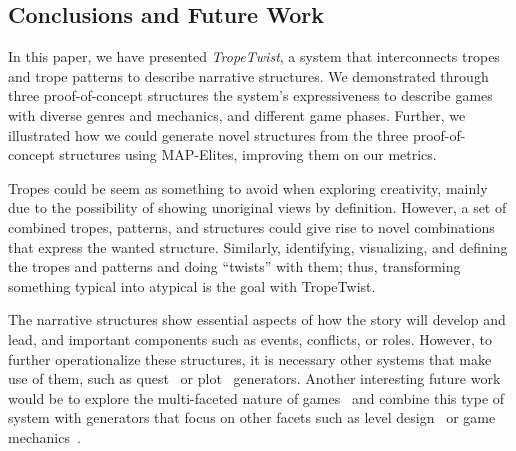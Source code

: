 \subsection{Conclusions and Future Work}


In this paper, we have presented \emph{TropeTwist}, a system that interconnects tropes and trope patterns to describe narrative structures. We demonstrated through three proof-of-concept structures the system's expressiveness to describe games with diverse genres and mechanics, and different game phases. Further, we illustrated how we could generate novel structures from the three proof-of-concept structures using MAP-Elites, improving them on our metrics. 

Tropes could be seem as something to avoid when exploring creativity, mainly due to the possibility of showing unoriginal views by definition. However, a set of combined tropes, patterns, and structures could give rise to novel combinations that express the wanted structure. Similarly, identifying, visualizing, and defining the tropes and patterns and doing ``twists'' with them; thus, transforming something typical into atypical is the goal with TropeTwist.

The narrative structures show essential aspects of how the story will develop and lead, and important components such as events, conflicts, or roles. However, to further operationalize these structures, it is necessary other systems that make use of them, such as quest~ or plot~ generators. Another interesting future work would be to explore the multi-faceted nature of games~ and combine this type of system with generators that focus on other facets such as level design~ or game mechanics~.

